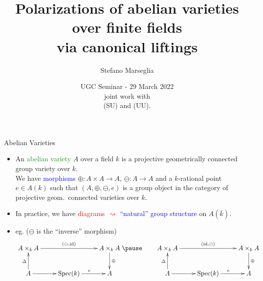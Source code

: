 \documentclass[usenames,dvipsnames,handout]{beamer}
\title[]{Polarizations of abelian varieties over finite fields\\ via canonical liftings}
\subtitle{}
\author[Stefano Marseglia]{Stefano Marseglia\\}
\institute[]{Utrecht University}
\date[21 April 2021]{UGC Seminar - 29 March 2022\\ \pause joint work with\\ \red{Jonas Bergstr\"om} (SU) and \red{Valentijn Karemaker} (UU).}
\def\C{\mathbb{C}}
\def\F{\mathbb{F}}
\newcommand{\red}[1]{\textcolor{red}{#1}}
\newcommand{\blue}[1]{\textcolor{blue}{#1}}
\newcommand{\green}[1]{\textcolor{ForestGreen}{#1}}
\begin{document}
\begin{frame}
\titlepage
\end{frame}


\begin{frame}{ Abelian Varieties }
	\begin{itemize}
	 \item An \green{abelian variety} $A$ over a field $k$ is a projective geometrically connected group variety over $k$.\\
	 \pause We have \blue{morphisms} $\oplus:A\times A \to A$, $\ominus:A\to A$ and a $k$-rational point $e\in A(k)$ such that $(A,\oplus,\ominus,e)$ is a group object in the category of projective geom.~connected varieties over $k$.
	 \pause \item In practice, we have \red{diagrams $\rightsquigarrow$} \blue{``natural'' group structure} on $A(\overline k)$.
	 \pause \item eg. ($\ominus$ is the ``inverse'' morphism)
	 {\tiny
	 \[ 
	 	\xymatrix{
	 		A\times_k A \ar[rr]^{(\ominus,\mathrm{id})} 	& 						& A\times_k A \ar[d]^{\oplus}\\
	 		A \ar[u]^{\Delta} \ar[r] 	& \mathrm{Spec}(k) \ar[r]^{e}	& A 
	 	}
	 	\pause \qquad
	 	\xymatrix{
	 		A\times_k A \ar[rr]^{(\mathrm{id},\ominus)} 	& 						& A\times_k A \ar[d]^{\oplus}\\
	 		A \ar[u]^{\Delta} \ar[r] 	& \mathrm{Spec}(k) \ar[r]^{e}	& A 
	 	}
	  \]}
	\end{itemize}
\end{frame}
\end{document}

